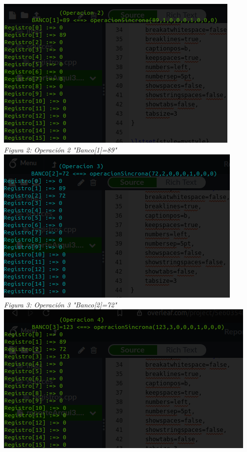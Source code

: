 \documentclass[12pt,executivepaper]{article}
\begin{document}
\begin{center}
    \includegraphics[scale=1]{imgs/tres.png}\\
    \textit{Figura 2: Operación 2 "Banco[1]=89"}\\
    \includegraphics[scale=1]{imgs/cuatro.png}\\
    \textit{Figura 3: Operación 3 "Banco[2]=72"}\\
    \includegraphics[scale=0.9]{imgs/cinco.png}\\

\end{center}
\end{document}
